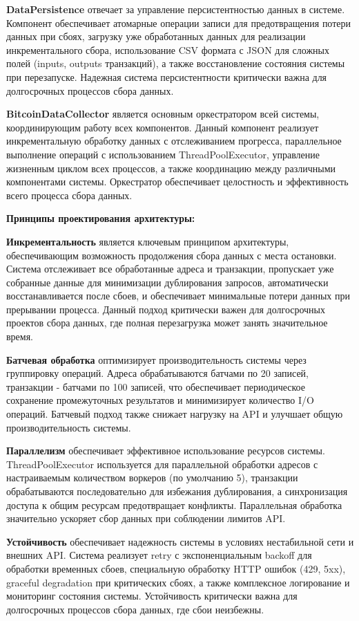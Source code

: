 \textbf{DataPersistence} отвечает за управление персистентностью данных в системе. Компонент обеспечивает атомарные операции записи для предотвращения потери данных при сбоях, загрузку уже обработанных данных для реализации инкрементального сбора, использование CSV формата с JSON для сложных полей (inputs, outputs транзакций), а также восстановление состояния системы при перезапуске. Надежная система персистентности критически важна для долгосрочных процессов сбора данных.

\textbf{BitcoinDataCollector} является основным оркестратором всей системы, координирующим работу всех компонентов. Данный компонент реализует инкрементальную обработку данных с отслеживанием прогресса, параллельное выполнение операций с использованием ThreadPoolExecutor, управление жизненным циклом всех процессов, а также координацию между различными компонентами системы. Оркестратор обеспечивает целостность и эффективность всего процесса сбора данных.

\textbf{Принципы проектирования архитектуры:}

\textbf{Инкрементальность} является ключевым принципом архитектуры, обеспечивающим возможность продолжения сбора данных с места остановки. Система отслеживает все обработанные адреса и транзакции, пропускает уже собранные данные для минимизации дублирования запросов, автоматически восстанавливается после сбоев, и обеспечивает минимальные потери данных при прерывании процесса. Данный подход критически важен для долгосрочных проектов сбора данных, где полная перезагрузка может занять значительное время.

\textbf{Батчевая обработка} оптимизирует производительность системы через группировку операций. Адреса обрабатываются батчами по 20 записей, транзакции - батчами по 100 записей, что обеспечивает периодическое сохранение промежуточных результатов и минимизирует количество I/O операций. Батчевый подход также снижает нагрузку на API и улучшает общую производительность системы.

\textbf{Параллелизм} обеспечивает эффективное использование ресурсов системы. ThreadPoolExecutor используется для параллельной обработки адресов с настраиваемым количеством воркеров (по умолчанию 5), транзакции обрабатываются последовательно для избежания дублирования, а синхронизация доступа к общим ресурсам предотвращает конфликты. Параллельная обработка значительно ускоряет сбор данных при соблюдении лимитов API.

\textbf{Устойчивость} обеспечивает надежность системы в условиях нестабильной сети и внешних API. Система реализует retry с экспоненциальным backoff для обработки временных сбоев, специальную обработку HTTP ошибок (429, 5xx), graceful degradation при критических сбоях, а также комплексное логирование и мониторинг состояния системы. Устойчивость критически важна для долгосрочных процессов сбора данных, где сбои неизбежны.

